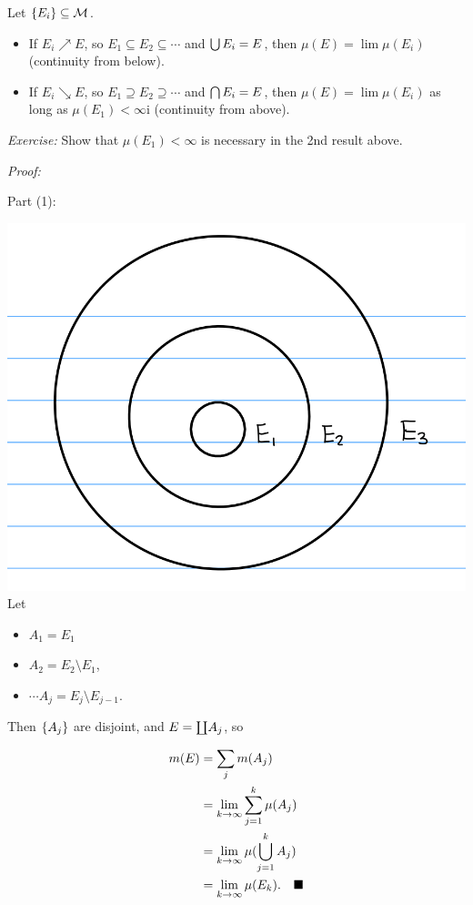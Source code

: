 Let \(\left\{{E_i}\right\} \subseteq \mathcal M\).

\begin{itemize}
\tightlist
\item
  If \(E_i \nearrow E\), so \(E_1 \subseteq E_2 \subseteq \cdots\) and
  \(\bigcup E_i = E\), then \(\mu(E) = \lim \mu(E_i)\) (continuity from
  below).
\item
  If \(E_i \searrow E\), so \(E_1 \supseteq E_2 \supseteq \cdots\) and
  \(\bigcap E_i = E\), then \(\mu(E) = \lim \mu(E_i)\) as long as
  \(\mu(E_1) < \infty\)i (continuity from above).
\end{itemize}

\emph{Exercise:} Show that \(\mu(E_1) < \infty\) is necessary in the 2nd
result above.

\emph{Proof:}

Part (1):

\includegraphics{figures/2019-09-05-11:20.png}\\

Let

\begin{itemize}
\tightlist
\item
  \(A_1 = E_1\)
\item
  \(A_2 = E_2 \setminus E_1\),
\item
  \(\cdots A_j = E_j \setminus E_{j-1}\).
\end{itemize}

Then \(\left\{{A_j}\right\}\) are disjoint, and \(E = {\coprod} A_j\), so

\begin{align*}
m(E) &= \sum_j m(A_j) \\
&= \lim_{k\to\infty} \sum _{j=1}^k \mu (A_j) \\
&= \lim_{k\to\infty} \mu(\union_{j=1}^k A_j) \\
&= \lim_{k\to\infty} \mu (E_k). \quad \qed
\end{align*}


